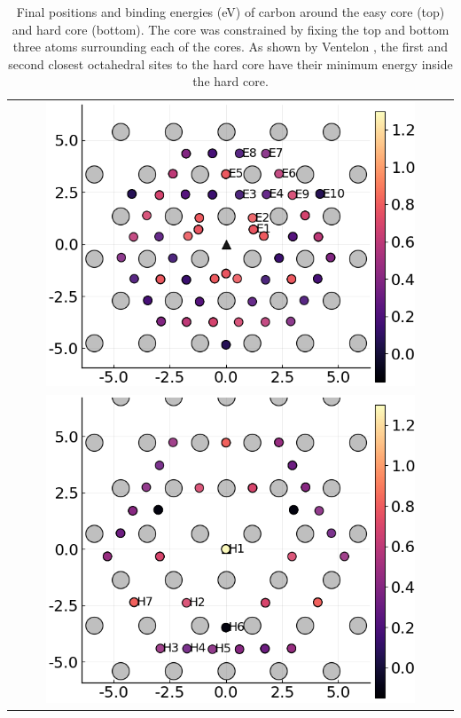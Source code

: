 \documentclass[a4paper,11pt]{article}
\begin{document}
{\begin{table}	
    \begin{tabular}{c}
 	          \includegraphics[width=0.85\textwidth]{../Images/easy_core_fe_C_positioning_energies_e10.png}  \\
 	          \includegraphics[width=0.85\textwidth]{../Images/hard_core_fe_C_positioning_energies_h7.png}  \\

     	     \end{tabular}		
\caption{ Final positions and binding energies (eV) of carbon around the easy core (top) and hard core (bottom). The core was constrained by fixing the top and bottom three atoms surrounding each of the cores. As shown by Ventelon \cite{Ventelon2015}, the first and second closest octahedral sites to the hard core have their minimum energy inside the hard core. }
   \end{table}


}
\end{document}
